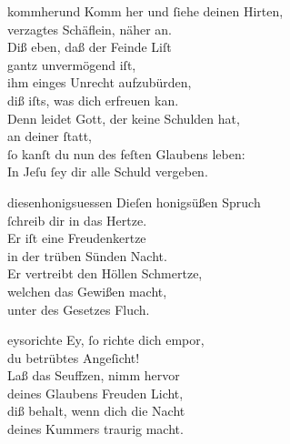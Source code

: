 \documentclass[tocstyle=ref-genre]{ees}
\begin{document}
{\begin{movement}{kommherund}
  Komm her und ſiehe deinen Hirten,\\
  verzagtes Schäflein, näher an.\\
  Diß eben, daß der Feinde Liſt\\
  gantz unvermögend iſt,\\
  ihm einges Unrecht aufzubürden,\\
  diß iſts, was dich erfreuen kan.\\
  Denn leidet Gott, der keine Schulden hat,\\
  an deiner ſtatt,\\
  ſo kanſt du nun des feſten Glaubens leben:\\
  In Jeſu ſey dir alle Schuld vergeben.
\end{movement}

\begin{movement}{diesenhonigsuessen}
  Dieſen honigsüßen Spruch\\
  ſchreib dir in das Hertze.\\
  Er iſt eine Freudenkertze\\
  in der trüben Sünden Nacht.\\
  Er vertreibt den Höllen Schmertze,\\
  welchen das Gewißen macht,\\
  unter des Gesetzes Fluch.
\end{movement}

\clearpage
\begin{movement}{eysorichte}
  \voice[Coro]
  Ey, ſo richte dich empor,\\
  du betrübtes Angeſicht!\\
  Laß das Seuffzen, nimm hervor\\
  deines Glaubens Freuden Licht,\\
  diß behalt, wenn dich die Nacht\\
  deines Kummers traurig macht.
\end{movement}

}
\end{document}
